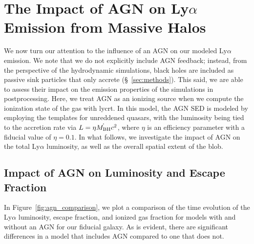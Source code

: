 \chapter{The Impact of AGN on Ly\texorpdfstring{$\alpha$}{a} Emission from Massive Halos}
\label{sec:agn}

We now turn our attention to the influence of an AGN on our modeled Ly$\alpha$ emission.
We note that we do not explicitly include AGN feedback; instead, from the perspective of the hydrodynamic simulations, black holes are included as passive sink particles that only accrete (\S~\ref{sec:methods}).
This said, we are able to assess their impact on the emission properties of the simulations in postprocessing.
Here, we treat AGN as an ionizing source when we compute the ionization state of the gas with {\sc lycrt}.
In this model, the AGN SED is modeled by employing the \citet*{Hopkins2007} templates for unreddened quasars, with the luminosity being tied to the accretion rate via $L = \eta \dot{M_{\rm BH}} c^2$, where $\eta$ is an efficiency parameter with a fiducial value of $\eta = 0.1$.
In what follows,  we investigate the impact of AGN on the total Ly$\alpha$ luminosity, as well as the overall spatial extent of the blob.


\section{Impact of AGN on Luminosity and Escape Fraction}
In Figure~\ref{fig:agn_comparison}, we plot a comparison of the time evolution of the Ly$\alpha$ luminosity, escape fraction, and ionized gas fraction for models with and without an AGN for our fiducial galaxy.  As is evident, there are significant differences in a model that includes AGN compared to one that does not.

